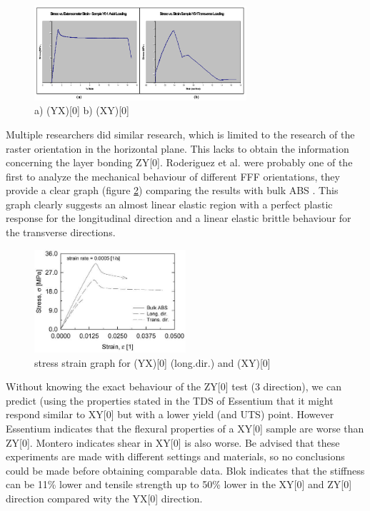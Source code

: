 \begin{figure}[H]
    \centering
    \includegraphics[width=0.7\textwidth]{chapter_2/figures/Transverseraster.PNG}
    \caption{a) (YX)[0] b) (XY)[0] \cite{Montero2001MaterialExperiments}}
    \label{fig:Transverseraster}
\end{figure}

Multiple researchers did similar research, which is limited to the research of the raster orientation in the horizontal plane. This lacks to obtain the information concerning the layer bonding ZY[0]. Roderiguez et al. were probably one of the first to analyze the mechanical behaviour of different FFF orientations, they provide a clear graph (figure \ref{fig:Rodriguezgraph}) comparing the results with bulk ABS \cite{Rodriguez2001MechanicalInvestigation}. This graph clearly suggests an almost linear elastic region with a perfect plastic response for the longitudinal direction and a linear elastic brittle behaviour for the transverse directions. 

\begin{figure}[H]
    \centering
    \includegraphics[width=0.5\textwidth]{chapter_2/figures/Rodriguezgraph.jpg}
    \caption{stress strain graph for (YX)[0] (long.dir.) and (XY)[0] \cite{Rodriguez2001MechanicalInvestigation}}
    \label{fig:Rodriguezgraph}
\end{figure}

Without knowing the exact behaviour of the ZY[0] test (3 direction), we can predict (using the properties stated in the TDS of Essentium \cite{EssentiumTechnicalPLA} that it might respond similar to XY[0] but with a lower yield (and UTS) point. However Essentium indicates that the flexural properties of a XY[0] sample are worse than ZY[0]. Montero indicates shear in XY[0] is also worse. Be advised that these experiments are made with different settings and materials, so no conclusions could be made before obtaining comparable data. Blok \cite{Blok2018AnComposites} indicates that the stiffness can be 11\% lower and tensile strength up to 50\% lower in the XY[0] and ZY[0] direction compared wity the YX[0] direction. 

